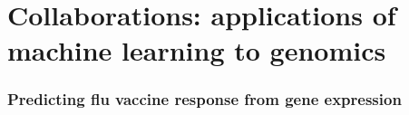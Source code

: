 \documentclass{beamer}
\begin{document}


\section*{Collaborations: applications of 
machine learning to genomics}

\begin{frame}
  \frametitle{Predicting flu vaccine response from gene expression}
\end{frame}
\end{document}
